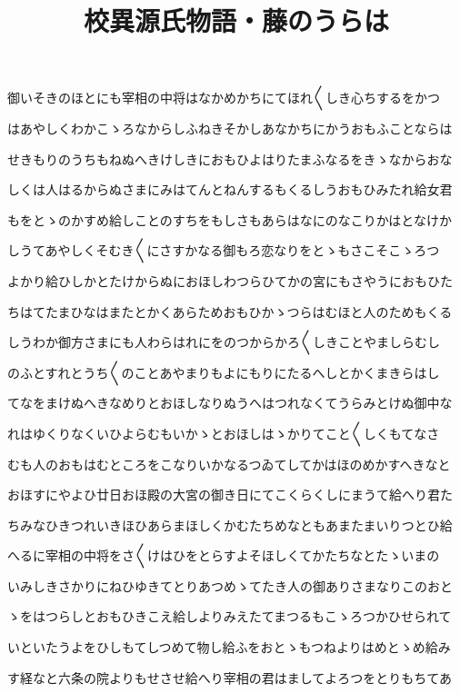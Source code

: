\documentclass[a4paper,11pt,landscape]{ltjtarticle}
\title{校異源氏物語・藤のうらは}
\date{}
\begin{document}
\maketitle

御いそきのほとにも宰相の中将はなかめかちにてほれ〱しき心ちするをかつ
\par\medskip
はあやしくわかこゝろなからしふねきそかしあなかちにかうおもふことならは
\par\medskip
せきもりのうちもねぬへきけしきにおもひよはりたまふなるをきゝなからおな
\par\medskip
しくは人はるからぬさまにみはてんとねんするもくるしうおもひみたれ給女君
\par\medskip
もをとゝのかすめ給しことのすちをもしさもあらはなにのなこりかはとなけか
\par\medskip
しうてあやしくそむき〱にさすかなる御もろ恋なりをとゝもさこそこゝろつ
\par\medskip
よかり給ひしかとたけからぬにおほしわつらひてかの宮にもさやうにおもひた
\par\medskip
ちはてたまひなはまたとかくあらためおもひかゝつらはむほと人のためもくる
\par\medskip
しうわか御方さまにも人わらはれにをのつからかろ〱しきことやましらむし
\par\medskip
のふとすれとうち〱のことあやまりもよにもりにたるへしとかくまきらはし
\par\medskip
てなをまけぬへきなめりとおほしなりぬうへはつれなくてうらみとけぬ御中な
\par\medskip
れはゆくりなくいひよらむもいかゝとおほしはゝかりてこと〱しくもてなさ
\par\medskip
むも人のおもはむところをこなりいかなるつゐてしてかはほのめかすへきなと
\par\medskip
おほすにやよひ廿日おほ殿の大宮の御き日にてこくらくしにまうて給へり君た
\par\medskip
ちみなひきつれいきほひあらまほしくかむたちめなともあまたまいりつとひ給
\par\medskip
へるに宰相の中将をさ〱けはひをとらすよそほしくてかたちなとたゝいまの
\par\medskip
いみしきさかりにねひゆきてとりあつめゝてたき人の御ありさまなりこのおと
\par\medskip
ゝをはつらしとおもひきこえ給しよりみえたてまつるもこゝろつかひせられて
\par\medskip
いといたうよをひしもてしつめて物し給ふをおとゝもつねよりはめとゝめ給み
\par\medskip
す経なと六条の院よりもせさせ給へり宰相の君はましてよろつをとりもちてあ
\end{document}
